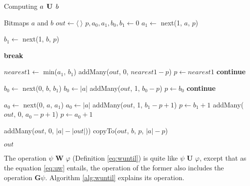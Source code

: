 \begin{algorithm}
\caption{Computing $a \mathrel{\mbox{\,\textbf{U}}}\, b$}
\label{alg:until}
\begin{multicols}{2}
\begin{algorithmic}[1]
\Require Bitmaps $a$ and $b$
\State $out \gets \langle~\rangle$
\State $p, a_0, a_1, b_0, b_1 \gets 0$
    \State $a_1 \gets$ next(1, $a$, $p$)
  \EndIf

    \State $b_1 \gets$ next(1, $b$, $p$)
  \EndIf

    \State \textbf{break}
  \EndIf

  \State $nearest1 \gets$ min($a_1$, $b_1$)
    \State addMany($out$, 0, $nearest1 - p$)
    \State $p \gets nearest1$
    \State \textbf{continue}
  \EndIf

      \State $b_0 \gets$ next(0, $b$, $b_1$)
        \State $b_0 \gets |a|$
      \EndIf
    \EndIf
    \State addMany($out$, 1, $b_0 - p$)
    \State $p \gets b_0$
    \State \textbf{continue}
  \EndIf

    \State $a_0 \gets$ next(0, $a$, $a_1$)
      \State $a_0 \gets |a|$
    \EndIf
  \EndIf
    \State addMany($out$, 1, $b_1 - p + 1$)
    \State $p \gets b_1 + 1$
  \Else
    \State addMany($out$, 0, $a_0 - p + 1$)
    \State $p \gets a_0 + 1$
  \EndIf
\EndWhile

  \State addMany($out$, 0, $|a| - |out|$))
  \State copyTo($out$, $b$, $p$, $|a| - p$)
\EndIf

\State \Return $out$
\end{algorithmic}
  \end{multicols}
\end{algorithm}

The operation $\psi \textbf{ W } \varphi$ (Definition \eqref{eq:wuntil}) is quite like $\psi \textbf{ U } \varphi$, except that as the equation \eqref{eq:uw} \citep{huth2004} entails, the operation of the former also includes the operation $\textbf{G}\psi$. Algorithm \ref{alg:wuntil} explains its operation.

